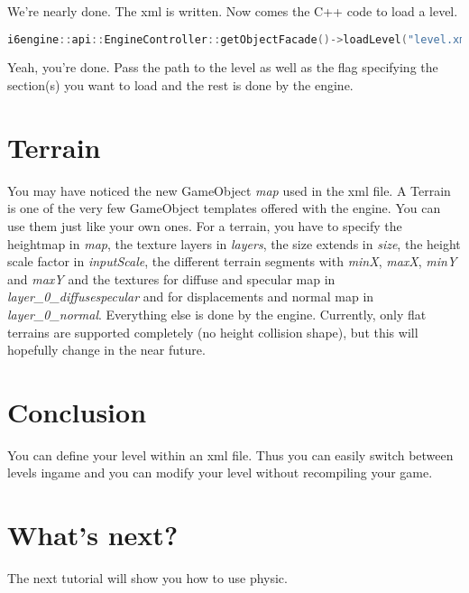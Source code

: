 \documentclass{article}
\begin{document}
We're nearly done. The xml is written. Now comes the C++ code to load a level.

\begin{lstlisting}[language=C++, style=basic, caption={loading a level}, label=code:load]
i6engine::api::EngineController::getObjectFacade()->loadLevel("level.xml", "A");
\end{lstlisting}

Yeah, you're done. Pass the path to the level as well as the flag specifying the section(s) you want to load and the rest is done by the engine.

\section{Terrain}

You may have noticed the new GameObject \textit{map} used in the xml file. A Terrain is one of the very few GameObject templates offered with the engine. You can use them just like your own ones. For a terrain, you have to specify the heightmap in \textit{map}, the texture layers in \textit{layers}, the size extends in \textit{size}, the height scale factor in \textit{inputScale}, the different terrain segments with \textit{minX}, \textit{maxX}, \textit{minY} and \textit{maxY} and the textures for diffuse and specular map in \textit{layer\_{}0\_{}diffusespecular} and for displacements and normal map in \textit{layer\_{}0\_{}normal}. Everything else is done by the engine. Currently, only flat terrains are supported completely (no height collision shape), but this will hopefully change in the near future.

\section{Conclusion}

You can define your level within an xml file. Thus you can easily switch between levels ingame and you can modify your level without recompiling your game.

\section{What's next?}

The next tutorial will show you how to use physic.
\end{document}
